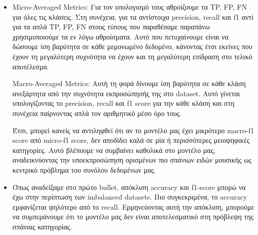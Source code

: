\begin{itemize}
\begin{enumerate}
		\item Για αυτό το λόγο ορίζουμε το precision. Αυτή η μετρική μας δίνει τον αριθμό θετικών δειγμάτων που εντοπίσαμε σε σχέση με το πόσα θετικά δείγματα υπάρχουν στο σύνολο του dataset, ακριβώς το παράδειγμα που συζητήσαμε πριν.
		$$precision = \frac{TP}{TP+FP}$$
		
		\item Το recall μας δίνει μια εικόνα για το ποιο ποσοστό από τα θετικά δείγματα που προβλέψαμε ήταν όντως θετικά, δηλαδή πόσα θετικά δείγματα κάναμε misclassify ως αρνητικά:
		$$recall = \frac{TP}{TP+FN}$$
		
		\item Όπως είναι φανερό από τους τύπους των μετρικών, δεν μπορούμε να μεγιστοποιήσουμε ταυτόχρονα precision και recall, υπάρχει μια σχέση tradeoff μεταξύ τους. Έτσι, πολλές φορές χρησιμοποιούμε τον αρμονικό μέσο τους, δηλαδή το f1-score:
		$$f1 = 2 \frac{Precision*Recall}{Precision+Recall}$$
	\end{enumerate}
	
	\item Micro-Averaged Metrics: Για τον υπολογισμό τους αθροίζουμε τα TP, FP, FN για όλες τις κλάσεις. Στη συνέχεια, για τα αντίστοιχα precision, recall και f1 αντί για τα απλά TP, FP, FN στους τύπους που παραθέσαμε παραπάνω χρησιμοποιούμε τα εν λόγω αθροίσματα. Αυτό που πετυχαίνουμε είναι να δώσουμε ίση βαρύτητα σε κάθε μεμονωμένο δεδομένο, κάνοντας έτσι εκείνες που έχουν τη μεγαλύτερη συχνότητα να έχουν και τη μεγαλύτερη επίδραση στο τελικό αποτέλεσμα.
	
	Macro-Averaged Metrics: Αυτή τη φορά δίνουμε ίση βαρύτητα σε κάθε κλάση ανεξάρτητα από την συχνότητα εκπροσώπησής της στο dataset. Αυτό γίνεται υπολογίζοντας το precision, recall και f1 score για την κάθε κλάση και στη συνέχεια παίρνοντας απλά τον αριθμητικό μέσο όρο τους. 
	
	Έτσι, μπορεί κανείς να αντιληφθεί ότι αν το μοντέλο μας έχει μικρότερο macro-f1 score από  micro-f1 score, δεν αποδίδει καλά σε μία ή περισσότερες μειοψηφικές κατηγορίες. Αυτό βλέπουμε να συμβαίνει καθολικά στο μοντέλο μας, αναδεικνύοντας την υποεκπροσώπηση ορισμένων πιο σπάνιων ειδών μουσικής ως κεντρικό πρόβλημα του συνόλου δεδομένων μας.
	
	\item Όπως αναδείξαμε στο πρώτο bullet, απόκλιση accuracy και f1-score μπορώ να έχω στην περίπτωση των imbalanced datasets. Πιο συγκεκριμένα, το accuracy εμφανίζεται ψηλότερο από το recall. Ερμηνεύοντας αυτή την απόκλιση, μπορούμε να συμπεράνουμε ότι το μοντέλο μας δεν είναι αποτελεσματικό στη πρόβλεψη της σπάνιας κατηγορίας.
	

\end{itemize}
